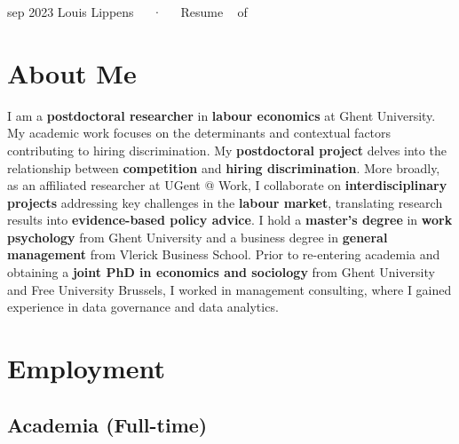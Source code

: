 \documentclass[11pt,a4paper,]{awesome-cv}
\begin{document}
\makecvheader

\makecvfooter
  {sep 2023}
    {Louis Lippens~~~·~~~Resume}
  {\thepage~ of \pageref{LastPage}~}





\hypertarget{about-me}{%
\section{About Me}\label{about-me}}

\footnotesize

I am a \textbf{postdoctoral researcher} in \textbf{labour economics} at
Ghent University. My academic work focuses on the determinants and
contextual factors contributing to hiring discrimination. My
\textbf{postdoctoral project} delves into the relationship between
\textbf{competition} and \textbf{hiring discrimination}. More broadly,
as an affiliated researcher at UGent @ Work, I collaborate on
\textbf{interdisciplinary projects} addressing key challenges in the
\textbf{labour market}, translating research results into
\textbf{evidence-based policy advice}. I hold a \textbf{master's degree}
in \textbf{work psychology} from Ghent University and a business degree
in \textbf{general management} from Vlerick Business School. Prior to
re-entering academia and obtaining a \textbf{joint PhD in economics and
sociology} from Ghent University and Free University Brussels, I worked
in management consulting, where I gained experience in data governance
and data analytics. \normalsize

\hypertarget{employment}{%
\section{Employment}\label{employment}}

\medskip

\hypertarget{academia-full-time}{%
\subsection{Academia (Full-time)}\label{academia-full-time}}
\end{document}
